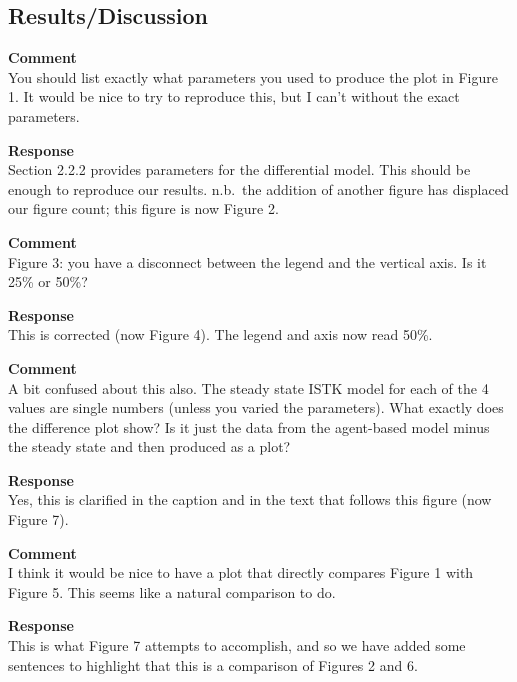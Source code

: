 \subsection{Results/Discussion}
\setcounter{rev2-results-discussion}{1}

\textbf{Comment } \\
You should list exactly what parameters you used to produce the plot in Figure 1.
It would be nice to try to reproduce this, but I can't without the exact parameters.

\textbf{Response } \\
Section 2.2.2 provides parameters for the differential model.
This should be enough to reproduce our results. n.b.\ the addition of another figure has displaced our figure count; this figure is now Figure 2.

\textbf{Comment } \\
Figure 3: you have a disconnect between the legend and the vertical axis.
Is it 25\% or 50\%?

\textbf{Response } \\
This is corrected (now Figure 4). The legend and axis now read 50\%.

\textbf{Comment } \\
A bit confused about this also.
The steady state ISTK model for each of the 4 values are single numbers (unless you varied the parameters).
What exactly does the difference plot show?
Is it just the data from the agent-based model minus the steady state and then produced as a plot?

\textbf{Response } \\
Yes, this is clarified in the caption and in the text that follows this figure (now Figure 7).

\textbf{Comment } \\
I think it would be nice to have a plot that directly compares Figure 1 with Figure 5.
This seems like a natural comparison to do.

\textbf{Response } \\
This is what Figure 7 attempts to accomplish, and so we have added some sentences to highlight that this is a comparison of Figures 2 and 6.

